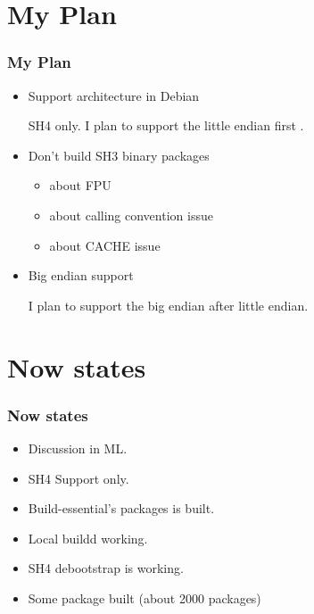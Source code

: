 \documentclass[cjk,dvipdfm,12pt]{beamer}
\begin{document}
\section{My Plan}
\begin{frame}
 \frametitle{My Plan}
 \begin{itemize}
  \item Support architecture in Debian
    
	SH4 only. 
	I plan to support the little endian first .

  \item Don't build SH3 binary packages

	\begin{itemize}
	  \item about FPU
	  \item about calling convention issue
	  \item about CACHE issue
	\end{itemize}
	
	

  \item Big endian support

	I plan to support the big endian after little endian.
  
 \end{itemize}
\end{frame}

\section{Now states}

\begin{frame}
 \frametitle{Now states}
 \begin{itemize}
  \item Discussion in ML.
  \item SH4 Support only.
  \item Build-essential's packages is built.
  \item Local buildd working.
  \item SH4 debootstrap is working.
  \item Some package built (about 2000 packages)
 \end{itemize}
\end{frame}
\end{document}
